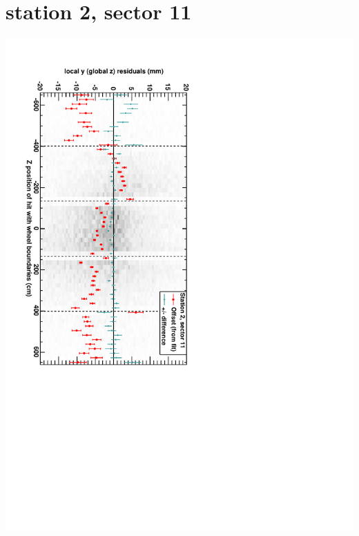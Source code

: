 \documentclass[compress]{beamer}
\begin{document}
\section*{station 2, sector 11}
\begin{frame} \vfill \mbox{\hspace{-1 cm}\includegraphics[height=1.2\linewidth, angle=90]{DTzVsZ_st2_sr11.pdf}} \end{frame}
\end{document}
